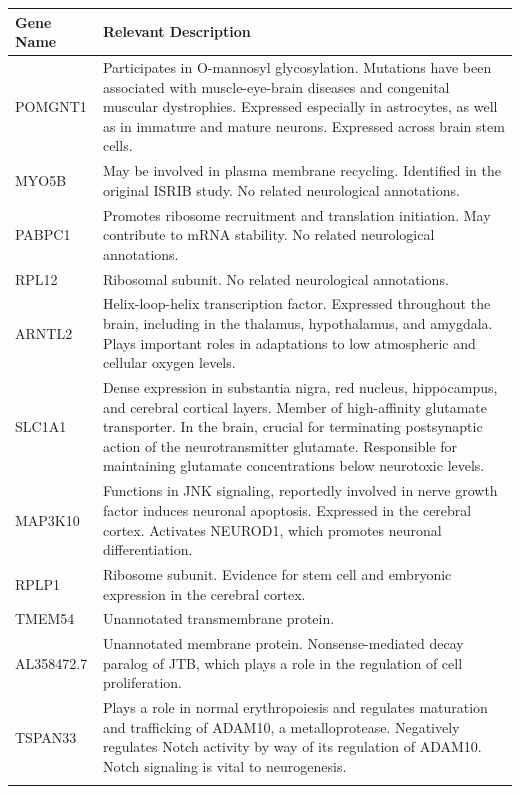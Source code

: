 \documentclass[10pt, oneside]{article}
\begin{document}
\begin{table}[!]
    \centering
{}
\begin{tabular}{p{2.5cm}p{15.5cm}}
 \textbf{Gene Name} & \textbf{Relevant Description} \\
 \hline
 POMGNT1 & Participates in O-mannosyl glycosylation. Mutations have been associated with muscle-eye-brain diseases and congenital muscular dystrophies. Expressed especially in astrocytes, as well as in immature and mature neurons. Expressed across brain stem cells. \\
 \hline
 MYO5B & May be involved in plasma membrane recycling. Identified in the original ISRIB study. No related neurological annotations. \\
 \hline
 PABPC1 & Promotes ribosome recruitment and translation initiation. May contribute to mRNA stability. No related neurological annotations. \\
 \hline
 RPL12 & Ribosomal subunit. No related neurological annotations. \\
 \hline
 ARNTL2 & Helix-loop-helix transcription factor. Expressed throughout the brain, including in the thalamus, hypothalamus, and amygdala. Plays important roles in adaptations to low atmospheric and cellular oxygen levels. \\
 \hline
 SLC1A1 & Dense expression in substantia nigra, red nucleus, hippocampus, and cerebral cortical layers. Member of high-affinity glutamate transporter. In the brain, crucial for terminating postsynaptic action of the neurotransmitter glutamate. Responsible for maintaining glutamate concentrations below neurotoxic levels. \\
 \hline
 MAP3K10 & Functions in JNK signaling, reportedly involved in nerve growth factor induces neuronal apoptosis. Expressed in the cerebral cortex. Activates NEUROD1, which promotes neuronal differentiation. \\
 \hline
 RPLP1 & Ribosome subunit. Evidence for stem cell and embryonic expression in the cerebral cortex. \\
 \hline
 TMEM54 & Unannotated transmembrane protein. \\
 \hline
 AL358472.7 & Unannotated membrane protein. Nonsense-mediated decay paralog of JTB, which plays a role in the regulation of cell proliferation. \\
 \hline
 TSPAN33 & Plays a role in normal erythropoiesis and regulates maturation and trafficking of ADAM10, a metalloprotease. Negatively regulates Notch activity by way of its regulation of ADAM10. Notch signaling is vital to neurogenesis. \\
 \label{tab:targets}
\end{tabular}
\end{table}
\end{document}
